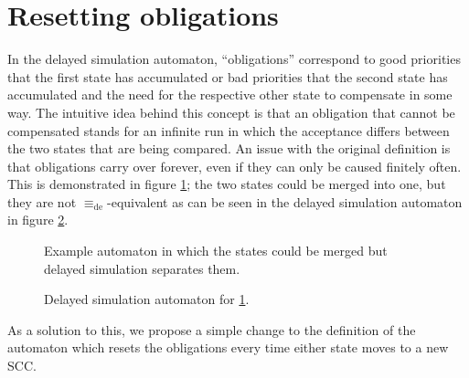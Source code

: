\section{Resetting obligations} 
In the delayed simulation automaton, \enquote{obligations} correspond to good priorities that the first state has accumulated or bad priorities that the second state has accumulated and the need for the respective other state to compensate in some way. The intuitive idea behind this concept is that an obligation that cannot be compensated stands for an infinite run in which the acceptance differs between the two states that are being compared. An issue with the original definition is that obligations carry over forever, even if they can only be caused finitely often. This is demonstrated in figure \ref{fig:fritzwilke:reset_oblig_example}; the two states could be merged into one, but they are not $\equiv_\text{de}$-equivalent as can be seen in the delayed simulation automaton in figure \ref{fig:fritzwilke:reset_oblig_example_dea}.

\begin{figure}
\centering
{}
\caption{Example automaton in which the states could be merged but delayed simulation separates them.}
\label{fig:fritzwilke:reset_oblig_example}
\end{figure}

\begin{figure}
\centering
{}
\caption{Delayed simulation automaton for \ref{fig:fritzwilke:reset_oblig_example}.}
\label{fig:fritzwilke:reset_oblig_example_dea}
\end{figure}

As a solution to this, we propose a simple change to the definition of the automaton which resets the obligations every time either state moves to a new SCC. 

